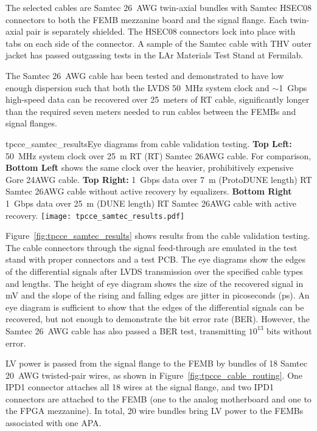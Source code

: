 The selected cables are Samtec 26~AWG twin-axial bundles with Samtec HSEC08 connectors to both
the FEMB mezzanine board and the signal flange. Each twin-axial pair is separately shielded.
The HSEC08
connectors lock into place with tabs on each side of the connector. A sample of the Samtec cable with
THV outer jacket has passed outgassing tests in the LAr Materials Test Stand at Fermilab.

The Samtec 26~AWG cable has been
tested and demonstrated to have low enough dispersion such that both the LVDS 50~MHz system clock and
$\sim$1~Gbps high-speed data can be recovered over 25~meters of RT cable, 
significantly longer than the required seven meters needed to run cables between the FEMBs and signal flanges.

\begin{cdrfigure}{tpcce_samtec_results}{Eye diagrams 
from cable validation testing. {\bf Top Left:} 50~MHz system clock over 25~m RT  
(RT) Samtec 26AWG cable. For comparison, {\bf Bottom Left} shows the same clock over 
the heavier, prohibitively expensive Gore 24AWG cable. {\bf Top Right:} 1~Gbps data over 
7~m (ProtoDUNE length) RT Samtec 26AWG cable without active recovery by equalizers. {\bf Bottom Right} 1~Gbps
data over 25~m (DUNE length) RT Samtec 26AWG cable with active recovery.}
\texttt{[image: tpcce\_samtec\_results.pdf]}
\end{cdrfigure}

Figure~\ref{fig:tpcce_samtec_results} shows results from the cable 
validation testing. The cable connectors through the signal feed-through are emulated in the test stand with 
proper connectors and a test PCB. The eye diagrams show the edges of the differential signals after 
LVDS transmission over the specified cable types and lengths. The height of eye diagram shows the size 
of the recovered signal in mV and the slope of the rising and falling edges are jitter in picoseconds (ps). 
An eye diagram is sufficient to show that the edges of the differential signals can
be recovered, but not enough to demonstrate the bit error rate (BER). However, the Samtec 26~AWG cable has 
also passed a BER test, transmitting $10^{13}$ bits without error.

LV power is passed from the signal flange to the FEMB by bundles of 18 Samtec 
20~AWG twisted-pair wires, as shown in Figure~\ref{fig:tpcce_cable_routing}. One IPD1 connector
attaches all 18 wires at the signal flange, and two IPD1 connectors are attached to the FEMB (one to the
analog motherboard and one to the FPGA mezzanine). In total, 20 wire bundles 
 bring LV power to the FEMBs associated with one APA.

